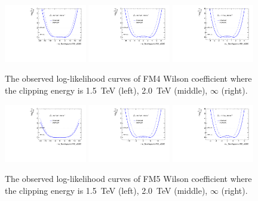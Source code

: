 \begin{figure}[ht]
    \centering
    \includegraphics[width=0.32\textwidth]{figures/aQGC/profileFM41500}
    	\includegraphics[width=0.32\textwidth]{figures/aQGC/profileFM42000}
        \includegraphics[width=0.32\textwidth]{figures/aQGC/profileFM4inf}
        \caption{The observed log-likelihood curves of FM4 Wilson coefficient where the clipping energy is 1.5~TeV (left), 2.0~TeV (middle), $\infty$ (right).}
        \label{fig:ProfileLL}
\end{figure}
\begin{figure}[ht]
    \centering
    \includegraphics[width=0.32\textwidth]{figures/aQGC/profileFM51500}
    	\includegraphics[width=0.32\textwidth]{figures/aQGC/profileFM52000}
        \includegraphics[width=0.32\textwidth]{figures/aQGC/profileFM5inf}
        \caption{The observed log-likelihood curves of FM5 Wilson coefficient where the clipping energy is 1.5~TeV (left), 2.0~TeV (middle), $\infty$ (right).}
        \label{fig:ProfileLL}
\end{figure}
